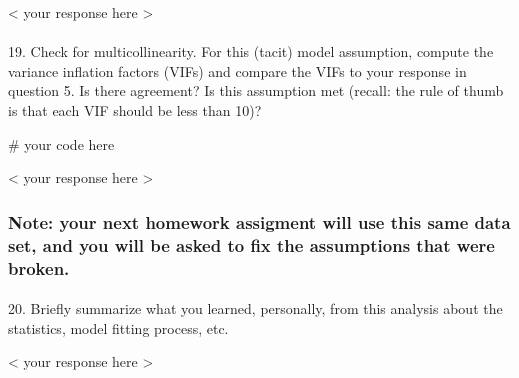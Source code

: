 \documentclass[
  letterpaper,
  DIV=11,
  numbers=noendperiod]{scrartcl}
\makeatletter
\let\oldparagraph\paragraph
\renewcommand{\paragraph}{
    \@ifstar
      \xxxParagraphStar
      \xxxParagraphNoStar
  }
\newcommand{\xxxParagraphStar}[1]{\oldparagraph*{#1}\mbox{}}
\newcommand{\xxxParagraphNoStar}[1]{\oldparagraph{#1}\mbox{}}
\newenvironment{Shaded}{\begin{snugshade}}{\end{snugshade}}
\newcommand{\CommentTok}[1]{\textcolor[rgb]{0.37,0.37,0.37}{#1}}
\makeatother
\begin{document}
\textless{} your response here \textgreater{}

\paragraph{19. Check for multicollinearity. For this (tacit) model
assumption, compute the variance inflation factors (VIFs) and compare
the VIFs to your response in question 5. Is there agreement? Is this
assumption met (recall: the rule of thumb is that each VIF should be
less than
10)?}\label{check-for-multicollinearity.-for-this-tacit-model-assumption-compute-the-variance-inflation-factors-vifs-and-compare-the-vifs-to-your-response-in-question-5.-is-there-agreement-is-this-assumption-met-recall-the-rule-of-thumb-is-that-each-vif-should-be-less-than-10}

\begin{Shaded}
\begin{Highlighting}[]
\CommentTok{\# your code here}
\end{Highlighting}
\end{Shaded}

\textless{} your response here \textgreater{}

\subsubsection{Note: your next homework assigment will use this same
data set, and you will be asked to fix the assumptions that were
broken.}\label{note-your-next-homework-assigment-will-use-this-same-data-set-and-you-will-be-asked-to-fix-the-assumptions-that-were-broken.}

\paragraph{20. Briefly summarize what you learned, personally, from this
analysis about the statistics, model fitting process,
etc.}\label{briefly-summarize-what-you-learned-personally-from-this-analysis-about-the-statistics-model-fitting-process-etc.}

\textless{} your response here \textgreater{}
\end{document}
